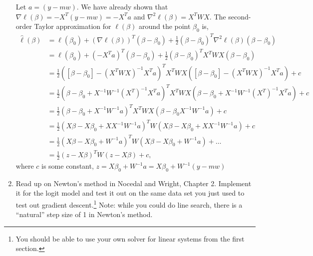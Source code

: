 \documentclass{article}
\begin{document}
\begin{enumerate}[label=(\Alph*)]
{	Let $a = (y-mw)$. We have already shown that $\nabla \ell(\beta) = -X^T (y-mw) = -X^T a$ and $\nabla^2 \ell (\beta) = X^T W X$. The second-order Taylor approximation for $\ell(\beta)$ around the point $\beta_0$ is,
	\begin{align}
		\hat{\ell}(\beta) &= \ell(\beta_0)+(\nabla \ell(\beta))^T(\beta-\beta_0) + \frac{1}{2}(\beta-\beta_0)^T \nabla^2 \ell(\beta) (\beta-\beta_0) \\
		&= \ell(\beta_0) + (-X^T a)^T(\beta - \beta_0) + \frac{1}{2}(\beta - \beta_0)^T X^T W X (\beta - \beta_0) \\
		&= \frac{1}{2} ( [ \beta - \beta_0 ] -(X^T W X)^{-1} X^T a )^T X^T W X ( [ \beta - \beta_0 ] -(X^T W X)^{-1} X^T a ) + c \\ 
		&= \frac{1}{2} (\beta - \beta_0  + X^{-1}W^{-1}(X^T)^{-1}X^T a )^T X^T W X (\beta - \beta_0 + X^{-1}W^{-1}(X^T)^{-1}X^T a ) + c \\
		&= \frac{1}{2} (\beta - \beta_0 + X^{-1}W^{-1} a )^T X^T W X (\beta - \beta_0 X^{-1}W^{-1} a ) + c \\
		&= \frac{1}{2} (X\beta - X\beta_0 + XX^{-1}W^{-1} a )^T W (X\beta - X\beta_0 + X X^{-1}W^{-1} a ) + c \\
		&= \frac{1}{2} (X\beta - X\beta_0 + W^{-1} a )^T W (X\beta - X\beta_0 + W^{-1} a ) + \ldots \\
		&= \frac{1}{2}(z-X\beta)^T W (z-X\beta) + c,
	\end{align}
	where $c$ is some constant, $z = X\beta_0 + W^{-1}a = X\beta_0 + W^{-1}(y-mw)$
}


\item Read up on Newton's method in Nocedal and Wright, Chapter 2.  Implement it for the logit model and test it out on the same data set you just used to test out gradient descent.\footnote{You should be able to use your own solver for linear systems from the first section.}  Note: while you could do line search, there is a ``natural'' step size of 1 in Newton's method.



\end{enumerate}
\end{document}
